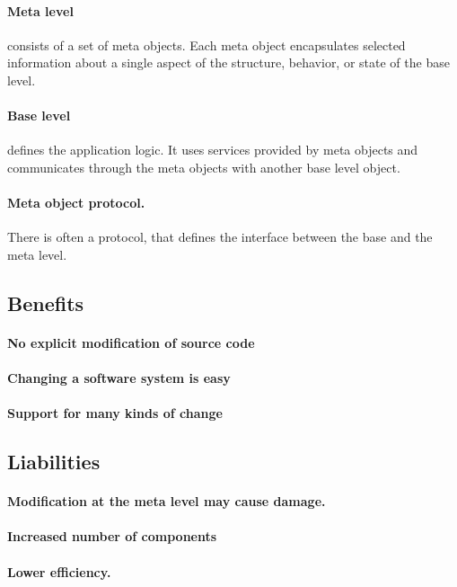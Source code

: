 \documentclass[a4paper,11pt,twocolumn]{report}
\begin{document}
    \paragraph{Meta level} consists of a set of meta objects. Each meta object
    encapsulates selected information about a single aspect of the structure,
    behavior, or state of the base level.
    \paragraph{Base level} defines the application logic. It uses services
    provided by meta objects and communicates through the meta objects with
    another base level object.
    \paragraph{Meta object protocol.} There is often a protocol, that defines
    the interface between the base and the meta level.
    \subsection{Benefits}
    \paragraph{No explicit modification of source code}
    \paragraph{Changing a software system is easy}
    \paragraph{Support for many kinds of change}
    \subsection{Liabilities}
    \paragraph{Modification at the meta level may cause damage.}
    \paragraph{Increased number of components}
    \paragraph{Lower efficiency.}
\end{document}
